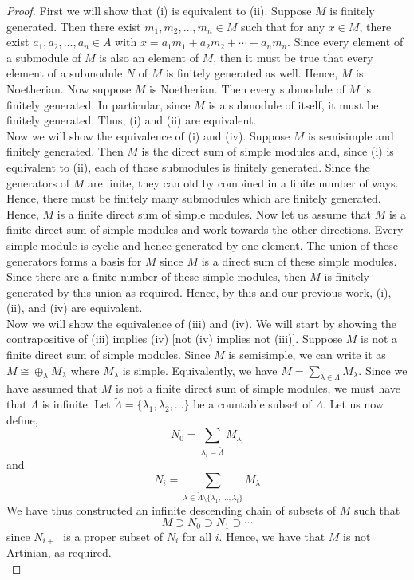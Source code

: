 \documentclass[11pt, reqno]{amsart}
\theoremstyle{plain}
\theoremstyle{definition}
\theoremstyle{example}
\begin{document}
\begin{proof}
First we will show that (i) is equivalent to (ii). Suppose $M$ is finitely generated. Then there exist $m_1, m_2, \ldots, m_n \in M$ such that for any $x \in M$, there exist $a_1, a_2, \ldots, a_n \in A$ with $x = a_1m_1 + a_2m_2 + \cdots + a_nm_n$. Since every element of a submodule of $M$ is also an element of $M$, then it must be true that every element of a submodule $N$ of $M$ is finitely generated as well. Hence, $M$ is Noetherian. Now suppose $M$ is Noetherian. Then every submodule of $M$ is finitely generated. In particular, since $M$ is a submodule of itself, it must be finitely generated. Thus, (i) and (ii) are equivalent.\\

Now we will show the equivalence of (i) and (iv). Suppose $M$ is semisimple and finitely generated. Then $M$ is the direct sum of simple modules and, since (i) is equivalent to (ii), each of those submodules is finitely generated. Since the generators of $M$ are finite, they can old by combined in a finite number of ways. Hence, there must be finitely many submodules which are finitely generated. Hence, $M$ is a finite direct sum of simple modules. Now let us assume that $M$ is a finite direct sum of simple modules and work towards the other directions. Every simple module is cyclic and hence generated by one element. The union of these generators forms a basis for $M$ since $M$ is a direct sum of these simple modules. Since there are a finite number of these simple modules, then $M$ is finitely-generated by this union as required. Hence, by this and our previous work, (i), (ii), and (iv) are equivalent.\\

Now we will show the equivalence of (iii) and (iv). We will start by showing the contrapositive of (iii) implies (iv) [not (iv) implies not (iii)]. Suppose $M$ is not a finite direct sum of simple modules. Since $M$ is semisimple, we can write it as $M \cong \oplus_{\lambda} M_{\lambda}$ where $M_{\lambda}$ is simple. Equivalently, we have $M = \sum_{\lambda \in \Lambda} M_{\lambda}$. Since we have assumed that $M$ is not a finite direct sum of simple modules, we must have that $\Lambda$ is infinite. Let $\tilde{\Lambda} = \{\lambda_1, \lambda_2, \ldots\}$ be a countable subset of $\Lambda$. Let us now define, $$N_0 = \sum_{\lambda_i = \tilde{\Lambda}} M_{\lambda_i}$$ and $$N_i = \sum_{\lambda \in \tilde{\Lambda} \setminus \{\lambda_1, \ldots, \lambda_i\}} M_{\lambda}$$ We have thus constructed an infinite descending chain of subsets of $M$ such that $$M \supset N_0 \supset N_1 \supset \cdots$$ since $N_{i+1}$ is a proper subset of $N_i$ for all $i$. Hence, we have that $M$ is not Artinian, as required.\\


\end{proof}
\end{document}
